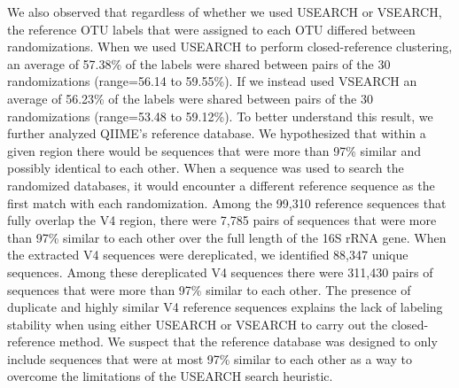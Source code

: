 \documentclass[11pt,]{article}
\begin{document}
We also observed that regardless of whether we used USEARCH or VSEARCH,
the reference OTU labels that were assigned to each OTU differed between
randomizations. When we used USEARCH to perform closed-reference
clustering, an average of 57.38\% of the labels were shared between
pairs of the 30 randomizations (range=56.14 to 59.55\%). If we instead
used VSEARCH an average of 56.23\% of the labels were shared between
pairs of the 30 randomizations (range=53.48 to 59.12\%). To better
understand this result, we further analyzed QIIME's reference database.
We hypothesized that within a given region there would be sequences that
were more than 97\% similar and possibly identical to each other. When a
sequence was used to search the randomized databases, it would encounter
a different reference sequence as the first match with each
randomization. Among the 99,310 reference sequences that fully overlap
the V4 region, there were 7,785 pairs of sequences that were more than
97\% similar to each other over the full length of the 16S rRNA gene.
When the extracted V4 sequences were dereplicated, we identified 88,347
unique sequences. Among these dereplicated V4 sequences there were
311,430 pairs of sequences that were more than 97\% similar to each
other. The presence of duplicate and highly similar V4 reference
sequences explains the lack of labeling stability when using either
USEARCH or VSEARCH to carry out the closed-reference method. We suspect
that the reference database was designed to only include sequences that
were at most 97\% similar to each other as a way to overcome the
limitations of the USEARCH search heuristic.
\end{document}
